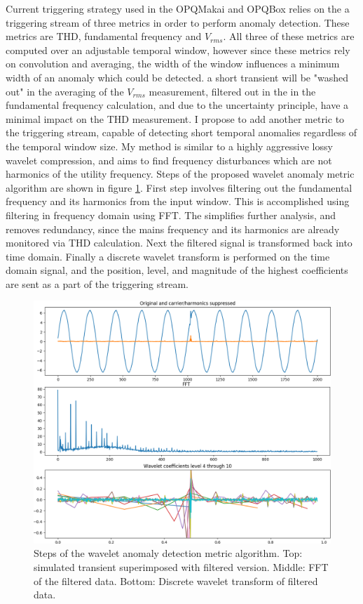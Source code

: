 Current triggering strategy used in the OPQMakai and OPQBox relies on the a triggering stream of three metrics in order to perform anomaly detection. These metrics are THD, fundamental frequency and $V_{rms}$. All three of these metrics are computed over an adjustable temporal window, however since these metrics rely on convolution and averaging, the width of the window influences a minimum width of an anomaly which could be detected. a short transient will be "washed out" in the averaging of the $V_{rms}$ measurement, filtered out in the in the fundamental frequency calculation, and due to the uncertainty principle, have a minimal impact on the THD measurement. I propose to add another metric to the triggering stream, capable of detecting short temporal anomalies regardless of the temporal window size. My method is similar to a highly aggressive lossy wavelet compression, and aims to find frequency disturbances which are not harmonics of the utility frequency. Steps of the proposed wavelet anomaly metric algorithm are shown in figure \ref{expdes:fig:1}. First step involves filtering out the fundamental frequency and its harmonics from the input window. This is accomplished using filtering in frequency domain using FFT. The simplifies further analysis, and removes redundancy, since the mains frequency and its harmonics are already monitored via THD calculation. Next the filtered signal is transformed back into time domain. Finally a discrete wavelet transform is performed on the time domain signal, and the position, level, and magnitude of the highest coefficients are sent as a part of the triggering stream. 

\begin{figure}[h]
	\centering
	\includegraphics[width=0.8\linewidth]{img/proposed_detection.png}	
	\caption{Steps of the wavelet anomaly detection metric algorithm. Top: simulated transient superimposed with filtered version. Middle: FFT of the filtered data. Bottom: Discrete wavelet transform of filtered data.}
	\label{expdes:fig:1}
\end{figure}

